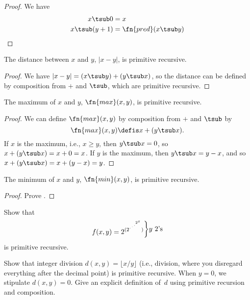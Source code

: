\documentclass[../../../include/open-logic-section]{subfiles}
\begin{document}
\begin{proof}
  We have
  \begin{align*}
    x \tsub 0 & = x\\
    x \tsub (y+1) & = \fn{pred}(x \tsub y)
  \end{align*}
\end{proof}

\begin{prop}
 The distance between $x$ and $y$, $\left|x-y\right|$, is primitive recursive.
\end{prop}

\begin{proof}
  We have $\left| x-y \right| = (x \tsub y) + (y \tsub x)$, so
  the distance can be defined by composition from $+$ and $\tsub$,
  which are primitive recursive.
\end{proof}

\begin{prop}
  The maximum of $x$ and $y$, $\fn{max}(x,y)$, is primitive recursive.
\end{prop}

\begin{proof}
  We can define $\fn{max}(x,y)$ by composition from $+$ and $\tsub$ by
  \[
  \fn{max}(x,y) \defis x + (y \tsub x).
  \]
  If $x$ is the maximum, i.e., $x \ge y$, then $y \tsub x = 0$, so $x
  + (y \tsub x) = x + 0 = x$. If $y$ is the maximum, then $y \tsub x =
  y - x$, and so $x + (y \tsub x) = x + (y - x) = y$.
\end{proof}

\begin{prop}
  The minimum of $x$ and $y$, $\fn{min}(x,y)$, is primitive recursive.
\end{prop}

\begin{proof}
  Prove .
\end{proof}

\begin{prob}
Show that \[
f(x, y) =
2^{(2^{\iddots^{2^{x}}})}\raisebox{1ex}{\bigg\rbrace}
\raisebox{1ex}{\text {$y$ $2$'s}}\] is primitive recursive.
\end{prob}

\begin{prob}
Show that integer division $d(x, y) = \lfloor x/y \rfloor$ (i.e.,
division, where you disregard everything after the decimal point) is
primitive recursive. When $y = 0$, we stipulate $d(x, y) = 0$. Give an
explicit definition of~$d$ using primitive recursion and
composition.
\end{prob}
\end{document}
